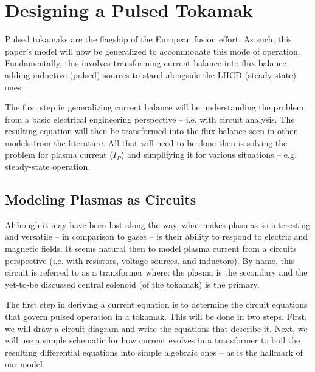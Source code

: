 %
%
%
%
%
%
%
%

\chapter{Designing a Pulsed Tokamak}

Pulsed tokamaks are the flagship of the European fusion effort. As such, this paper's model will now be generalized to accommodate this mode of operation. Fundamentally, this involves transforming current balance into flux balance -- adding inductive (pulsed) sources to stand alongside the LHCD (steady-state) ones.

The first step in generalizing current balance will be understanding the problem from a basic electrical engineering perspective -- i.e. with circuit analysis. The resulting equation will then be transformed into the flux balance seen in other models from the literature. All that will need to be done then is solving the problem for plasma current ($I_P$) and simplifying it for various situations -- e.g. steady-state operation.

\section{Modeling Plasmas as Circuits}

Although it may have been lost along the way, what makes plasmas so interesting and versatile -- in comparison to gases -- is their ability to respond to electric and magnetic fields. It seems natural then to model plasma current from a circuits perspective (i.e. with resistors, voltage sources, and inductors). By name, this circuit is referred to as a transformer where: the plasma is the secondary and the yet-to-be discussed central solenoid (of the tokamak) is the primary.

The first step in deriving a current equation is to determine the circuit equations that govern pulsed operation in a tokamak. This will be done in two steps. First, we will draw a circuit diagram and write the equations that describe it. Next, we will use a simple schematic for how current evolves in a transformer to boil the resulting differential equations into simple algebraic ones -- as is the hallmark of our model.


